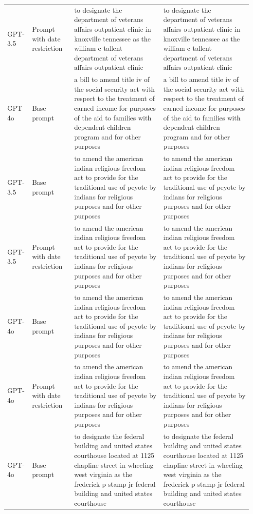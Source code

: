 \begin{longtable}{>{\raggedright\arraybackslash}p{1.4cm}>{\raggedright\arraybackslash}p{1.4cm}>{\raggedright\arraybackslash}p{5.5cm}>{\raggedright\arraybackslash}p{5.5cm}}
GPT-3.5 & Prompt with date restriction & to designate the department of veterans affairs outpatient clinic in knoxville tennessee as the william c tallent department of veterans affairs outpatient clinic & to designate the department of veterans affairs outpatient clinic in knoxville tennessee as the william c tallent department of veterans affairs outpatient clinic\\
GPT-4o & Base prompt & a bill to amend title iv of the social security act with respect to the treatment of earned income for purposes of the aid to families with dependent children program and for other purposes & a bill to amend title iv of the social security act with respect to the treatment of earned income for purposes of the aid to families with dependent children program and for other purposes\\
GPT-3.5 & Base prompt & to amend the american indian religious freedom act to provide for the traditional use of peyote by indians for religious purposes and for other purposes & to amend the american indian religious freedom act to provide for the traditional use of peyote by indians for religious purposes and for other purposes\\
GPT-3.5 & Prompt with date restriction & to amend the american indian religious freedom act to provide for the traditional use of peyote by indians for religious purposes and for other purposes & to amend the american indian religious freedom act to provide for the traditional use of peyote by indians for religious purposes and for other purposes\\
GPT-4o & Base prompt & to amend the american indian religious freedom act to provide for the traditional use of peyote by indians for religious purposes and for other purposes & to amend the american indian religious freedom act to provide for the traditional use of peyote by indians for religious purposes and for other purposes\\
GPT-4o & Prompt with date restriction & to amend the american indian religious freedom act to provide for the traditional use of peyote by indians for religious purposes and for other purposes & to amend the american indian religious freedom act to provide for the traditional use of peyote by indians for religious purposes and for other purposes\\
GPT-4o & Base prompt & to designate the federal building and united states courthouse located at 1125 chapline street in wheeling west virginia as the frederick p stamp jr federal building and united states courthouse & to designate the federal building and united states courthouse located at 1125 chapline street in wheeling west virginia as the frederick p stamp jr federal building and united states courthouse\\

\end{longtable}
